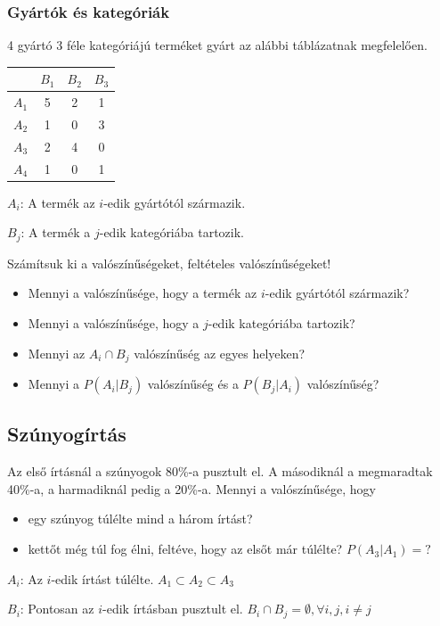 \documentclass[a4paper]{article}
\begin{document}
\subsubsection{Gyártók és kategóriák}

4 gyártó 3 féle kategóriájú terméket gyárt az alábbi táblázatnak megfelelően.

\begin{tabular}{l|ccc|}
& $B_1$ & $B_2$ & $B_3$ \\
\hline
$A_1$ & 5 & 2 & 1 \\
$A_2$ & 1 & 0 & 3 \\
$A_3$ & 2 & 4 & 0 \\
$A_4$ & 1 & 0 & 1 \\
\hline
\end{tabular}

$A_i$: A termék az $i$-edik gyártótól származik.

$B_j$: A termék a $j$-edik kategóriába tartozik.

Számítsuk ki a valószínűségeket, feltételes valószínűségeket!

\begin{itemize}
\item Mennyi a valószínűsége, hogy a termék az $i$-edik gyártótól származik?
\item Mennyi a valószínűsége, hogy a $j$-edik kategóriába tartozik?
\item Mennyi az $A_i \cap B_j$ valószínűség az egyes helyeken?
\item Mennyi a $P(A_i|B_j)$ valószínűség és a $P(B_j|A_i)$ valószínűség?
\end{itemize}

\subsection{Szúnyogírtás}

Az első írtásnál a szúnyogok 80\%-a pusztult el.
A másodiknál a megmaradtak 40\%-a, a harmadiknál pedig a 20\%-a.
Mennyi a valószínűsége, hogy
\begin{itemize}
\item egy szúnyog túlélte mind a három írtást?
\item kettőt még túl fog élni, feltéve, hogy az elsőt már túlélte? $P(A_3|A_1) = ?$
\end{itemize}

$A_i$: Az $i$-edik írtást túlélte. $A_1 \subset A_2 \subset A_3$

$B_i$: Pontosan az $i$-edik írtásban pusztult el. $B_i \cap B_j = \emptyset, \forall i, j, i \neq j$
\end{document}
